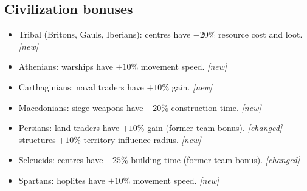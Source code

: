 \documentclass{article}
\begin{document}
\clearpage
\subsection{Civilization bonuses}
\begin{itemize}
  \item Tribal (Britons, Gauls, Iberians):
  \subitem centres have $-20\%$ resource cost and loot. \emph{[new]}
  \item Athenians:
  \subitem warships have $+10\%$ movement speed. \emph{[new]}
  \item Carthaginians:
  \subitem naval traders have $+10\%$ gain. \emph{[new]}
  \item Macedonians:
  \subitem siege weapons have $-20\%$ construction time. \emph{[new]}
  \item Persians:
  \subitem land traders have $+10\%$ gain (former team bonus). \emph{[changed]}
  \subitem structures $+10\%$ territory influence radius. \emph{[new]}
  \item Seleucids:
  \subitem centres have $-25\%$ building time (former team bonus). \emph{[changed]}
  \item Spartans:
  \subitem hoplites have $+10\%$ movement speed. \emph{[new]}
\end{itemize}
\end{document}
